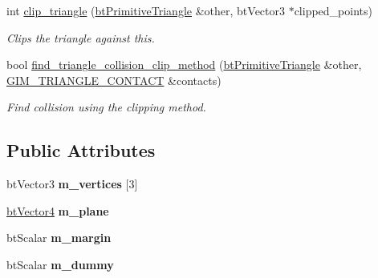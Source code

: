 \begin{DoxyCompactItemize}
\item 
int \hyperlink{classbt_primitive_triangle_a56e930410f18f866e47431ed77c6c3ca}{clip\+\_\+triangle} (\hyperlink{classbt_primitive_triangle}{bt\+Primitive\+Triangle} \&other, bt\+Vector3 $\ast$clipped\+\_\+points)
\begin{DoxyCompactList}\small\item\em Clips the triangle against this. \end{DoxyCompactList}\item 
bool \hyperlink{classbt_primitive_triangle_a24c4903aecd95c2d11bbc42ba3df0e66}{find\+\_\+triangle\+\_\+collision\+\_\+clip\+\_\+method} (\hyperlink{classbt_primitive_triangle}{bt\+Primitive\+Triangle} \&other, \hyperlink{struct_g_i_m___t_r_i_a_n_g_l_e___c_o_n_t_a_c_t}{G\+I\+M\+\_\+\+T\+R\+I\+A\+N\+G\+L\+E\+\_\+\+C\+O\+N\+T\+A\+C\+T} \&contacts)
\begin{DoxyCompactList}\small\item\em Find collision using the clipping method. \end{DoxyCompactList}\end{DoxyCompactItemize}
\subsection*{Public Attributes}
\begin{DoxyCompactItemize}
\item 
\hypertarget{classbt_primitive_triangle_a26239c0109fc0a279f1ed0369783eea3}{bt\+Vector3 {\bfseries m\+\_\+vertices} \mbox{[}3\mbox{]}}\label{classbt_primitive_triangle_a26239c0109fc0a279f1ed0369783eea3}

\item 
\hypertarget{classbt_primitive_triangle_acee3713806388dc0cbcffd2cd72e6947}{\hyperlink{classbt_vector4}{bt\+Vector4} {\bfseries m\+\_\+plane}}\label{classbt_primitive_triangle_acee3713806388dc0cbcffd2cd72e6947}

\item 
\hypertarget{classbt_primitive_triangle_a7650fff79447f8adcaa30a06c3caef39}{bt\+Scalar {\bfseries m\+\_\+margin}}\label{classbt_primitive_triangle_a7650fff79447f8adcaa30a06c3caef39}

\item 
\hypertarget{classbt_primitive_triangle_a54a0a58a99e14a99747a4d2d1a248fab}{bt\+Scalar {\bfseries m\+\_\+dummy}}\label{classbt_primitive_triangle_a54a0a58a99e14a99747a4d2d1a248fab}

\end{DoxyCompactItemize}


